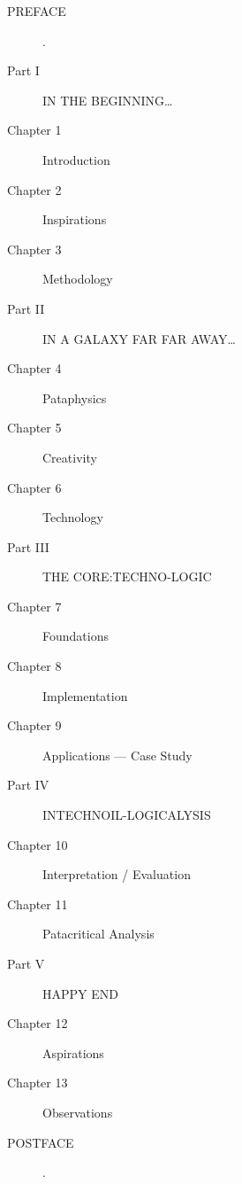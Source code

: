 \begin{description}
  \item[PREFACE] .
  \item[Part I] IN THE BEGINNING\ldots
  \item[Chapter 1] Introduction
  \item[Chapter 2] Inspirations
  \item[Chapter 3] Methodology
  \item[Part II] IN A GALAXY FAR FAR AWAY\ldots
  \item[Chapter 4] Pataphysics
  \item[Chapter 5] Creativity
  \item[Chapter 6] Technology
  \item[Part III] THE CORE:\@ TECHNO-LOGIC
  \item[Chapter 7] Foundations
  \item[Chapter 8] Implementation
  \item[Chapter 9] Applications --- Case Study
  \item[Part IV] INTECHNOIL-LOGICALYSIS
  \item[Chapter 10] Interpretation / Evaluation
  \item[Chapter 11] Patacritical Analysis
  \item[Part V] HAPPY END
  \item[Chapter 12] Aspirations
  \item[Chapter 13] Observations
  \item[POSTFACE] .
\end{description}


\stopcontents[chapters]
